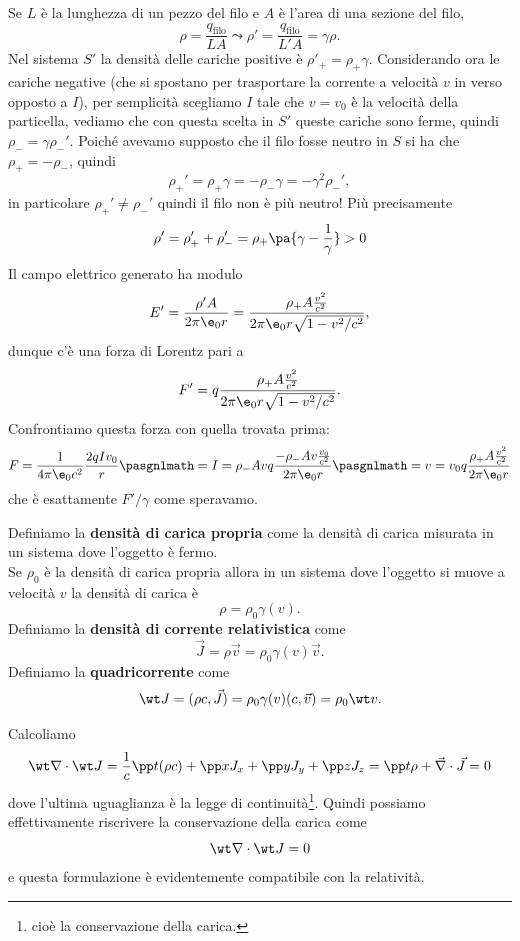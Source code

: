 \begin{example}
\noindent
Se $L$ \`e la lunghezza di un pezzo del filo e $A$ \`e l'area di una sezione del filo,
\[\rho=\frac {q_{\text{filo}}}{LA}\leadsto \rho'=\frac {q_{\text{filo}}}{L'A}=\gamma \rho.\]
Nel sistema $S'$ la densit\`a delle cariche positive \`e $\rho'_+=\rho_+\gamma$. Considerando ora le cariche negative (che si spostano per trasportare la corrente a velocit\`a $v$ in verso opposto a $I$), per semplicit\`a scegliamo $I$ tale che $v=v_0$ \`e la velocit\`a della particella, vediamo che con questa scelta in $S'$ queste cariche sono ferme, quindi $\rho_-=\gamma \rho_-'$. Poich\'e avevamo supposto che il filo fosse neutro in $S$ si ha che $\rho_+=-\rho_-$, quindi \[\rho_+'=\rho_+\gamma=-\rho_-\gamma=-\gamma^2\rho_-',\]
in particolare $\rho_+'\neq \rho_-'$ quindi il filo non \`e pi\`u neutro! Pi\`u precisamente
\[\rho'=\rho'_++\rho_-'=\rho_+\pa{\gamma-\frac1\gamma}>0\]
Il campo elettrico generato ha modulo
\[E'=\frac{\rho' A}{2\pi\e_0r}=\frac{\rho_+A\frac{v^2}{c^2}}{2\pi\e_0 r\sqrt{1-v^2/c^2}},\]
dunque c'\`e una forza di Lorentz pari a 
\[F'=q\frac{\rho_+A\frac{v^2}{c^2}}{2\pi\e_0 r\sqrt{1-v^2/c^2}}.\]
Confrontiamo questa forza con quella trovata prima:
\[F=\frac1{4\pi \e_0c^2}\frac{2 qIv_0}r\pasgnlmath={I=\rho_-Av}q\frac{-\rho_- Av \frac{v_0}{c^2}}{2\pi \e_0 r}\pasgnlmath={v=v_0}q\frac{\rho_+ A \frac{v^2}{c^2}}{2\pi \e_0 r}\]
che \`e esattamente $F'/\gamma$ come speravamo.
\end{example}

\begin{definition}
Definiamo la \textbf{densit\`a di carica propria} come la densit\`a di carica misurata in un sistema dove l'oggetto \`e fermo.\\
Se $\rho_0$ \`e la densit\`a di carica propria allora in un sistema dove l'oggetto si muove a velocit\`a $v$ la densit\`a di carica \`e
\[\rho=\rho_0\gamma(v).\]
Definiamo la \textbf{densit\`a di corrente relativistica} come
\[\vec J=\rho\vec v=\rho_0\gamma(v)\vec v.\]
Definiamo la \textbf{quadricorrente} come
\[\wt J=(\rho c,\vec J)=\rho_0\gamma(v)(c,\vec v)=\rho_0\wt v.\]
\end{definition}


\begin{remark}
Calcoliamo
\[\wt \nabla \cdot \wt J=\frac1c\pp t{(\rho c)}+\pp x{J_x}+\pp y{J_y}+\pp z{J_z}=\pp t\rho+\vec\nabla \cdot \vec J=0\]
dove l'ultima uguaglianza \`e la legge di continuit\`a\footnote{cio\`e la conservazione della carica.}. Quindi possiamo effettivamente riscrivere la conservazione della carica come
\[\wt\nabla\cdot \wt J=0\]
e questa formulazione \`e evidentemente compatibile con la relativit\`a.
\end{remark}

